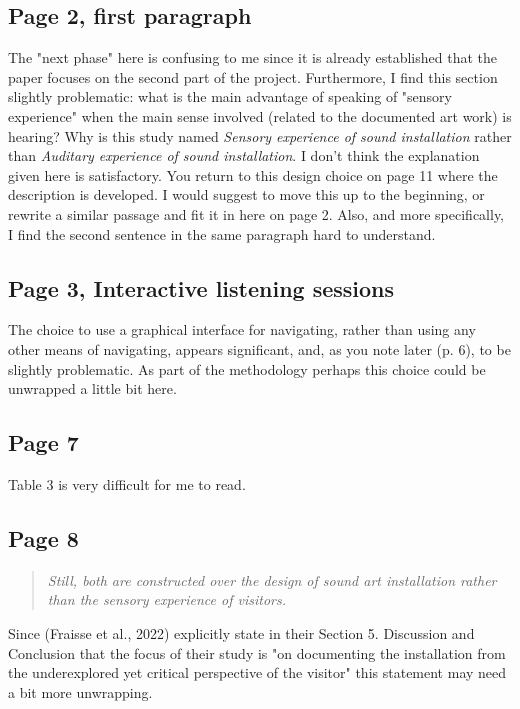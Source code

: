 \documentclass[11pt]{article}
\begin{document}
\subsection*{Page 2, first paragraph}
\label{sec:org2b2f55d}
The "next phase" here is confusing to me since it is already established that the paper focuses on the second part of the project. Furthermore, I find this section slightly problematic: what is the main advantage of speaking of "sensory experience" when the main sense involved (related to the documented art work) is hearing? Why is this study named \emph{Sensory experience of sound installation} rather than \emph{Auditary experience of sound installation}. I don't think the explanation given here is satisfactory. You return to this design choice on page 11 where the description is developed. I would suggest to move this up to the beginning, or rewrite a similar passage and fit it in here on page 2. Also, and more specifically, I find the second sentence in the same paragraph hard to understand.
\subsection*{Page 3, Interactive listening sessions}
\label{sec:orgf25a33d}
The choice to use a graphical interface for navigating, rather than using any other means of navigating, appears significant, and, as you note later (p. 6), to be slightly problematic. As part of the methodology perhaps this choice could be unwrapped a little bit here.
\subsection*{Page 7}
\label{sec:orgde6ff90}
Table 3 is very difficult for me to read.
\subsection*{Page 8}
\label{sec:org1cec6e5}
\begin{quote}
\emph{Still, both are constructed over the design of sound art
installation rather than the sensory experience of visitors.}
\end{quote}
Since (Fraisse et al., 2022) explicitly state in their Section 5. Discussion and Conclusion that the focus of their study is "on documenting the installation from the underexplored yet critical perspective of the visitor" this statement may need a bit more unwrapping. 
\end{document}

